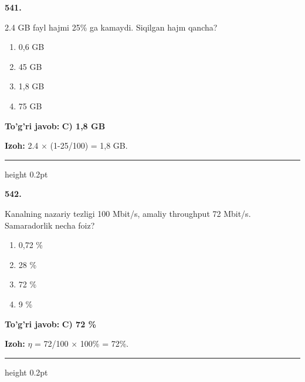 \documentclass[10pt,a4paper,oneside]{article}
\begin{document}
\noindent\textbf{\color{ink}541.}
\par
2.4 GB fayl hajmi 25\% ga kamaydi. Siqilgan hajm qancha?
\begin{enumerate}[label=\Alph*),leftmargin=9mm]
\item 0,6 GB
\item 45 GB
\item 1,8 GB
\item 75 GB
\end{enumerate}
\begin{tcolorbox}[enhanced,breakable,colback=teal!4,colframe=teal!50!black,boxrule=0.5pt,arc=1.1mm,left=3mm,right=3mm,top=1.7mm,bottom=1.7mm,before skip=2mm,after skip=2mm]
\textbf{\color{teal}To'g'ri javob:} \textbf{C) 1,8 GB}
\par\smallskip
\textbf{Izoh:} 2.4 \ensuremath{\times} (1-25/100) = 1,8 GB.
\end{tcolorbox}
\vspace{2mm}\hrule height 0.2pt \vspace{3mm}

\noindent\textbf{\color{ink}542.}
\par
Kanalning nazariy tezligi 100 Mbit/s, amaliy throughput 72 Mbit/s. Samaradorlik necha foiz?
\begin{enumerate}[label=\Alph*),leftmargin=9mm]
\item 0,72 \%
\item 28 \%
\item 72 \%
\item 9 \%
\end{enumerate}
\begin{tcolorbox}[enhanced,breakable,colback=teal!4,colframe=teal!50!black,boxrule=0.5pt,arc=1.1mm,left=3mm,right=3mm,top=1.7mm,bottom=1.7mm,before skip=2mm,after skip=2mm]
\textbf{\color{teal}To'g'ri javob:} \textbf{C) 72 \%}
\par\smallskip
\textbf{Izoh:} \ensuremath{\eta} = 72/100 \ensuremath{\times} 100\% = 72\%.
\end{tcolorbox}
\vspace{2mm}\hrule height 0.2pt \vspace{3mm}
\end{document}
